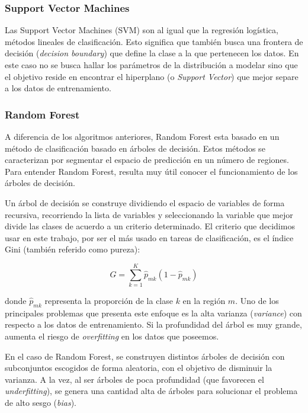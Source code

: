 \subsubsection{Support Vector Machines}

Las Support Vector Machines (SVM) son al igual que la regresión logística, métodos lineales de clasificación. Esto significa que también busca una frontera de decisión (\textit{decision boundary}) que define la clase a la que pertenecen los datos. En este caso no se busca hallar los parámetros de la distribución a modelar sino que el objetivo reside en encontrar el hiperplano (o \textit{Support Vector}) que mejor separe a los datos de entrenamiento. 

\subsubsection{Random Forest}

A diferencia de los algoritmos anteriores, Random Forest esta basado en un método de clasificación basado en árboles de decisión. Estos métodos se caracterizan por segmentar el espacio de predicción en un número de regiones. Para entender Random Forest, resulta muy útil conocer el funcionamiento de los árboles de decisión. 

Un árbol de decisión se construye dividiendo el espacio de variables de forma recursiva, recorriendo la lista de variables y seleccionando la variable que mejor divide las clases de acuerdo a un criterio determinado. El criterio que decidimos usar en este trabajo, por ser el más usado en tareas de clasificación, es el índice Gini (también referido como pureza):

\begin{equation*}
    G = \sum_{k = 1}^{K} \hat{p}_{mk}(1 - \hat{p}_{mk})
\end{equation*}

donde $\hat{p}_{mk}$ representa la proporción de la clase $k$ en la región $m$. Uno de los principales problemas que presenta este enfoque es la alta varianza (\textit{variance}) con respecto a los datos de entrenamiento. Si la profundidad del árbol es muy grande, aumenta el riesgo de \textit{overfitting} en los datos que poseemos. 

En el caso de Random Forest, se construyen distintos árboles de decisión con subconjuntos escogidos de forma aleatoria, con el objetivo de disminuir la varianza. A la vez, al ser árboles de poca profundidad (que favorecen el \textit{underfitting}), se genera una cantidad alta de árboles para solucionar el problema de alto sesgo (\textit{bias}).

